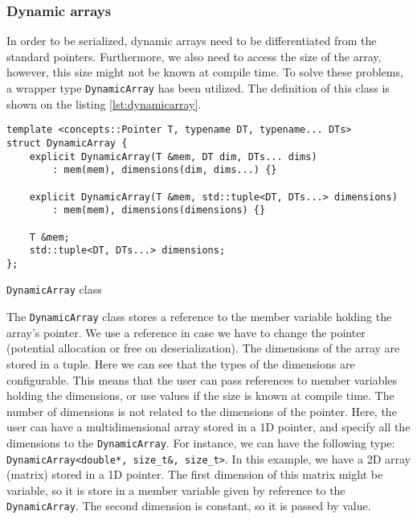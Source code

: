 \subsubsection{Dynamic arrays}

In order to be serialized, dynamic arrays need to be differentiated from the
standard pointers. Furthermore, we also need to access the size of the array,
however, this size might not be known at compile time. To solve these problems,
a wrapper type \texttt{DynamicArray} has been utilized. The definition of this
class is shown on the listing \ref{lst:dynamicarray}.

\begin{listing}[ht!]
\begin{verbatim}
template <concepts::Pointer T, typename DT, typename... DTs>
struct DynamicArray {
    explicit DynamicArray(T &mem, DT dim, DTs... dims)
        : mem(mem), dimensions(dim, dims...) {}

    explicit DynamicArray(T &mem, std::tuple<DT, DTs...> dimensions)
        : mem(mem), dimensions(dimensions) {}

    T &mem;
    std::tuple<DT, DTs...> dimensions;
};
\end{verbatim}
\caption{\texttt{DynamicArray} class}
\label{lst:dynamicarray}
\end{listing}

The \texttt{DynamicArray} class stores a reference to the member variable
holding the array's pointer. We use a reference in case we have to change the
pointer (potential allocation or free on deserialization). The dimensions of the
array are stored in a tuple. Here we can see that the types of the dimensions
are configurable. This means that the user can pass references to member
variables holding the dimensions, or use values if the size is known at compile
time. The number of dimensions is not related to the dimensions of the pointer.
Here, the user can have a multidimensional array stored in a 1D pointer, and
specify all the dimensions to the \texttt{DynamicArray}. For instance, we can
have the following type: \texttt{DynamicArray<double*, size\_t\&, size\_t>}. In
this example, we have a 2D array (matrix) stored in a 1D pointer. The first
dimension of this matrix might be variable, so it is store in a member variable
given by reference to the \texttt{DynamicArray}. The second dimension is
constant, so it is passed by value.

